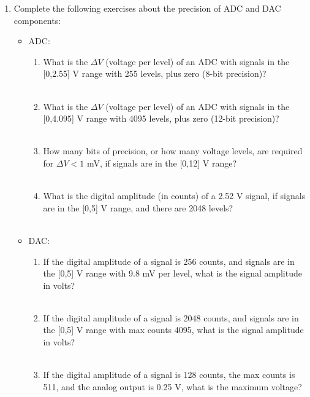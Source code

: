 \documentclass{article}
\begin{document}
\begin{enumerate}
\item Complete the following exercises about the precision of ADC and DAC components:
\begin{itemize}
\item ADC:
\begin{enumerate}
\item What is the $\Delta V$ (voltage per level) of an ADC with signals in the [0,2.55] V range with 255 levels, plus zero (8-bit precision)? \\ \\
\item What is the $\Delta V$ (voltage per level) of an ADC with signals in the [0,4.095] V range with 4095 levels, plus zero (12-bit precision)? \\ \\
\item How many bits of precision, or how many voltage levels, are required for $\Delta V < 1$ mV, if signals are in the [0,12] V range? \\ \\
\item What is the digital amplitude (in counts) of a 2.52 V signal, if signals are in the [0,5] V range, and there are 2048 levels? \\ \\
\end{enumerate}
\item DAC:
\begin{enumerate}
\item If the digital amplitude of a signal is 256 counts, and signals are in the [0,5] V range with 9.8 mV per level, what is the signal amplitude in volts? \\ \\
\item If the digital amplitude of a signal is 2048 counts, and signals are in the [0,5] V range with max counts 4095, what is the signal amplitude in volts? \\ \\
\item If the digital amplitude of a signal is 128 counts, the max counts is 511, and the analog output is 0.25 V, what is the maximum voltage? \\ \\ \\ \\
\end{enumerate}
\end{itemize}

\end{enumerate}
\end{document}
